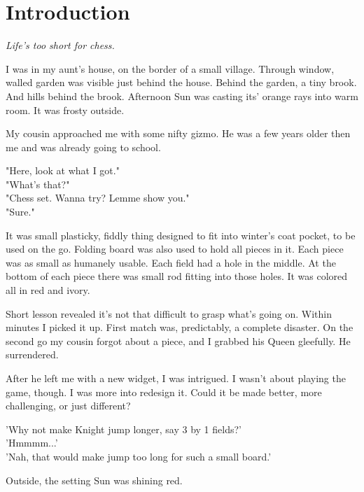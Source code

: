 
\chapter*{Introduction}

\begin{flushright}
\parbox{0.6\textwidth}{
\emph{Life's too short for chess. \\
 } }
\end{flushright}

\noindent
I was in my aunt's house, on the border of a small village.
Through window, walled garden was visible just behind the house.
Behind the garden, a tiny brook. And hills behind the brook.
Afternoon Sun was casting its' orange rays into warm room. It
was frosty outside.

My cousin approached me with some nifty gizmo. He was a
few years older then me and was already going to school.

\noindent
"Here, look at what I got." \\
\hspace*{\fill}"What's that?" \\
"Chess set. Wanna try? Lemme show you." \\
\hspace*{\fill}"Sure."

It was small plasticky, fiddly thing designed to fit into winter's
coat pocket, to be used on the go. Folding board was also used to
hold all pieces in it. Each piece was as small as humanely usable.
Each field had a hole in the middle. At the bottom of each piece
there was small rod fitting into those holes. It was colored all
in red and ivory.

Short lesson revealed it's not that difficult to grasp what's going
on. Within minutes I picked it up. First match was, predictably, a
complete disaster. On the second go my cousin forgot about a piece,
and I grabbed his Queen gleefully. He surrendered.

After he left me with a new widget, I was intrigued. I wasn't
about playing the game, though. I was more into redesign it. Could it
be made better, more challenging, or just different?

\noindent
'Why not make Knight jump longer, say 3 by 1 fields?' \\
'Hmmmm...' \\
'Nah, that would make jump too long for such a small board.'

Outside, the setting Sun was shining red.

\clearpage %

